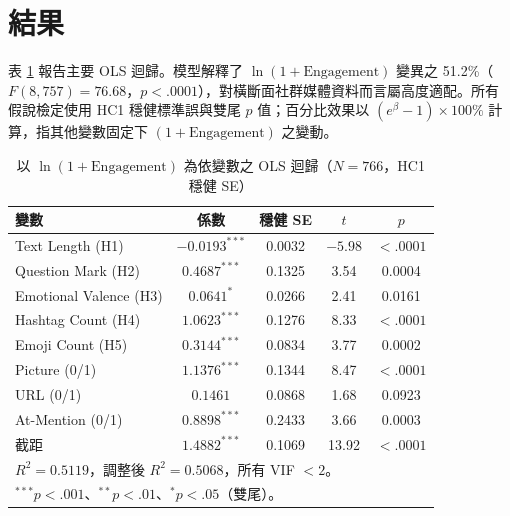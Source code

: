 \documentclass[12pt,a4paper]{ctexart}
\begin{document}
\section{結果}

表 \ref{tab:reg} 報告主要 OLS 迴歸。模型解釋了 $\ln(1+\text{Engagement})$ 變異之 51.2\%（$F(8,757)=76.68$，$p<.0001$），對橫斷面社群媒體資料而言屬高度適配。所有假說檢定使用 HC1 穩健標準誤與雙尾 $p$ 值；百分比效果以 $(e^{\beta}-1)\times 100\%$ 計算，指其他變數固定下 $(1+\text{Engagement})$ 之變動。

\begin{table}[H]
\centering\small
\caption{以 $\ln(1+\text{Engagement})$ 為依變數之 OLS 迴歸（$N=766$，HC1 穩健 SE）}
\label{tab:reg}
\begin{tabular}{lcccc}
\toprule
變數 & 係數 & 穩健 SE & $t$ & $p$ \\
\midrule
Text Length (H1) & $-0.0193^{***}$ & 0.0032 & $-5.98$ & $<.0001$ \\
Question Mark (H2) & $0.4687^{***}$ & 0.1325 & 3.54 & 0.0004 \\
Emotional Valence (H3) & $0.0641^{*}$ & 0.0266 & 2.41 & 0.0161 \\
Hashtag Count (H4) & $1.0623^{***}$ & 0.1276 & 8.33 & $<.0001$ \\
Emoji Count (H5) & $0.3144^{***}$ & 0.0834 & 3.77 & 0.0002 \\
Picture (0/1) & $1.1376^{***}$ & 0.1344 & 8.47 & $<.0001$ \\
URL (0/1) & $0.1461$ & 0.0868 & 1.68 & 0.0923 \\
At-Mention (0/1) & $0.8898^{***}$ & 0.2433 & 3.66 & 0.0003 \\
截距 & $1.4882^{***}$ & 0.1069 & 13.92 & $<.0001$ \\
\midrule
\multicolumn{5}{l}{$R^2 = 0.5119$，調整後 $R^2 = 0.5068$，所有 VIF $<2$。} \\
\multicolumn{5}{l}{$^{***}p<.001$、$^{**}p<.01$、$^{*}p<.05$（雙尾）。} \\
\end{tabular}
\end{table}
\end{document}
